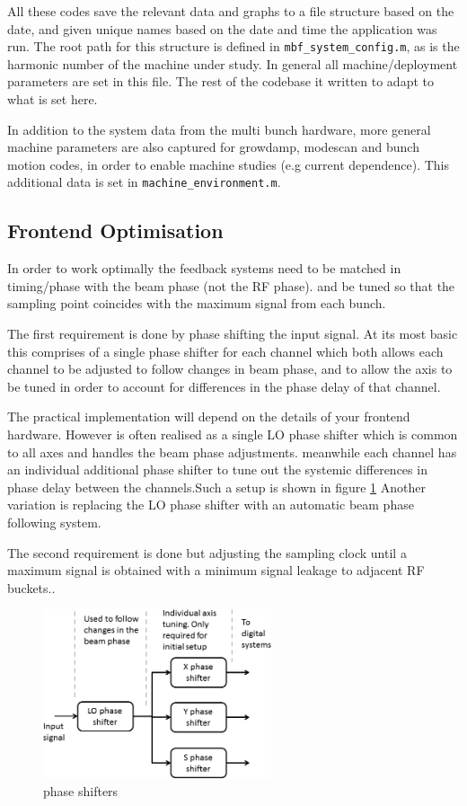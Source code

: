 \documentclass{report}
\begin{document}
All these codes save the relevant data and graphs to a file structure based on the date, and given unique names based on the date and time the application was run. The root path for this structure is defined in \verb|mbf_system_config.m|, as is the harmonic number of the machine under study. In general all machine/deployment parameters are set in this file. The rest of the codebase it written to adapt to what is set here.

In addition to the system data from the multi bunch hardware, more general machine parameters are also captured for growdamp, modescan and bunch motion codes, in order to enable machine studies (e.g current dependence). This additional data is set in \verb|machine_environment.m|.

\subsection{Frontend Optimisation}
In order to work optimally the feedback systems need to be matched in timing/phase with the beam phase (not the RF phase). and be tuned so that the sampling point coincides with the maximum signal from each bunch.

The first requirement is done by phase shifting the input signal. At its most basic this comprises of a single phase shifter for each channel which both allows each channel to be adjusted to follow changes in beam phase, and to allow the axis to be  tuned in order to account for differences in the phase delay of that channel.

The practical implementation will depend on the details of your frontend hardware.
However is often realised as a single LO phase shifter which is common to all axes and handles the beam phase adjustments. meanwhile each channel has an individual additional phase shifter to tune out the systemic differences in phase delay between the channels.Such a setup is shown in figure \ref{fig:phase_shifters}
Another variation is replacing the LO phase shifter with an automatic beam phase following system.

The second requirement is done but adjusting the sampling clock until a maximum signal is obtained with a minimum signal leakage to adjacent RF buckets..
\begin{figure}[hbt]
    \centering
        \includegraphics[width=0.6\textwidth]{phase_shifters_overview.png}
        \caption{phase shifters}
        \label{fig:phase_shifters}
\end{figure}
\end{document}
